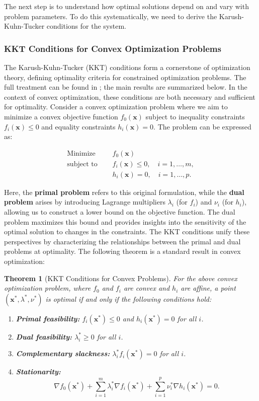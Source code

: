 \documentclass{article}
\newtheorem{theorem}{Theorem}
\begin{document}
The next step is to understand how optimal solutions depend on and vary with problem parameters. To do this systematically, we need to derive the Karush-Kuhn-Tucker conditions for the system. 

\subsubsection{KKT Conditions for Convex Optimization Problems}

The Karush-Kuhn-Tucker (KKT) conditions form a cornerstone of optimization theory, defining optimality criteria for constrained optimization problems. The full treatment can be found in \citet{boyd2004convex}; the main results are summarized below. In the context of convex optimization, these conditions are both necessary and sufficient for optimality. Consider a convex optimization problem where we aim to minimize a convex objective function $f_0(\mathbf{x})$ subject to inequality constraints $f_i(\mathbf{x}) \leq 0$ and equality constraints $h_i(\mathbf{x}) = 0$. The problem can be expressed as:

\begin{align*}
    \text{Minimize } & \quad f_0(\mathbf{x}) \\
    \text{subject to } & \quad f_i(\mathbf{x}) \leq 0, \quad i = 1, \dots, m, \\
    & \quad h_i(\mathbf{x}) = 0, \quad i = 1, \dots, p.
\end{align*}

Here, the \textbf{primal problem} refers to this original formulation, while the \textbf{dual problem} arises by introducing Lagrange multipliers $\lambda_i$ (for $f_i$) and $\nu_i$ (for $h_i$), allowing us to construct a lower bound on the objective function. The dual problem maximizes this bound and provides insights into the sensitivity of the optimal solution to changes in the constraints. The KKT conditions unify these perspectives by characterizing the relationships between the primal and dual problems at optimality. The following theorem is a standard result in convex optimization:

\begin{theorem}[KKT Conditions for Convex Problems]
\label{thm:kkt}
For the above convex optimization problem, where $f_0$ and $f_i$ are convex and $h_i$ are affine, a point $(\mathbf{x}^*, \lambda^*, \nu^*)$ is optimal if and only if the following conditions hold:
\begin{enumerate}
    \item \textbf{Primal feasibility:} $f_i(\mathbf{x}^*) \leq 0$ and $h_i(\mathbf{x}^*) = 0$ for all $i$.
    \item \textbf{Dual feasibility:} $\lambda_i^* \geq 0$ for all $i$.
    \item \textbf{Complementary slackness:} $\lambda_i^* f_i(\mathbf{x}^*) = 0$ for all $i$.
    \item \textbf{Stationarity:}
    \[
    \nabla f_0(\mathbf{x}^*) + \sum_{i=1}^m \lambda_i^* \nabla f_i(\mathbf{x}^*) + \sum_{i=1}^p \nu_i^* \nabla h_i(\mathbf{x}^*) = 0.
    \]
\end{enumerate}
\end{theorem}
\end{document}

